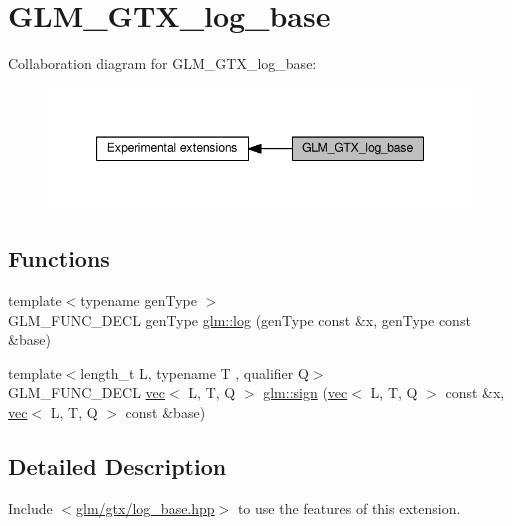 \hypertarget{group__gtx__log__base}{}\section{G\+L\+M\+\_\+\+G\+T\+X\+\_\+log\+\_\+base}
\label{group__gtx__log__base}
Collaboration diagram for G\+L\+M\+\_\+\+G\+T\+X\+\_\+log\+\_\+base\+:
\nopagebreak
\begin{figure}[H]
\begin{center}
\leavevmode
\includegraphics[width=347pt]{d2/d51/group__gtx__log__base}
\end{center}
\end{figure}
\subsection*{Functions}
\begin{DoxyCompactItemize}
\item 
{\footnotesize template$<$typename gen\+Type $>$ }\\G\+L\+M\+\_\+\+F\+U\+N\+C\+\_\+\+D\+E\+CL gen\+Type \hyperlink{group__gtx__log__base_ga60a7b0a401da660869946b2b77c710c9}{glm\+::log} (gen\+Type const \&x, gen\+Type const \&base)
\item 
{\footnotesize template$<$length\+\_\+t L, typename T , qualifier Q$>$ }\\G\+L\+M\+\_\+\+F\+U\+N\+C\+\_\+\+D\+E\+CL \hyperlink{structglm_1_1vec}{vec}$<$ L, T, Q $>$ \hyperlink{group__gtx__log__base_ga04ef803a24f3d4f8c67dbccb33b0fce0}{glm\+::sign} (\hyperlink{structglm_1_1vec}{vec}$<$ L, T, Q $>$ const \&x, \hyperlink{structglm_1_1vec}{vec}$<$ L, T, Q $>$ const \&base)
\end{DoxyCompactItemize}


\subsection{Detailed Description}
Include $<$\hyperlink{log__base_8hpp}{glm/gtx/log\+\_\+base.\+hpp}$>$ to use the features of this extension.

